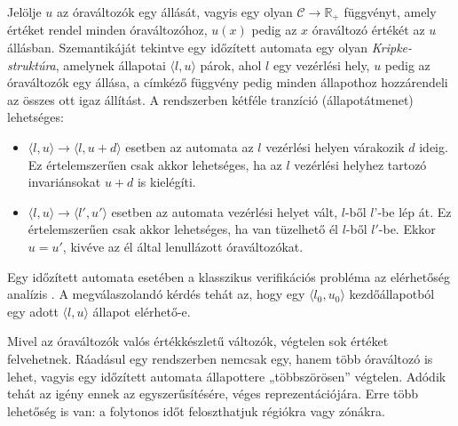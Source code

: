 Jelölje $u$ az óraváltozók egy állását, vagyis egy olyan $\mathcal{C} \rightarrow \mathbb{R}_+$ függvényt, amely értéket rendel minden óraváltozóhoz, $u(x)$ pedig az $x$ óraváltozó értékét az $u$ állásban. Szemantikáját tekintve egy időzített automata egy olyan \emph{Kripke-struktúra}, amelynek állapotai $\langle l, u \rangle$ párok, ahol $l$ egy vezérlési hely, $u$ pedig az óraváltozók egy állása, a címkéző függvény pedig minden állapothoz hozzárendeli az összes ott igaz állítást. A rendszerben kétféle tranzíció (állapotátmenet) lehetséges:
\begin{itemize}
    \item $\langle l, u \rangle \rightarrow \langle l, u + d \rangle$ esetben az automata az $l$ vezérlési helyen várakozik $d$ ideig. Ez értelemszerűen csak akkor lehetséges, ha az $l$ vezérlési helyhez tartozó invariánsokat $u + d$ is kielégíti.
    \item $\langle l, u \rangle \rightarrow \langle l', u' \rangle$ esetben az automata vezérlési helyet vált, $l$-ből $l$'-be lép át. Ez értelemszerűen csak akkor lehetséges, ha van tüzelhető él $l$-ből $l'$-be. Ekkor $u = u'$, kivéve az él által lenullázott óraváltozókat.
\end{itemize}
Egy időzített automata esetében a klasszikus verifikációs probléma az elérhetőség analízis \cite{RealTimeModelChecking}. A megválaszolandó kérdés tehát az, hogy egy $\langle l_0, u_0 \rangle$ kezdőállapotból egy adott $\langle l, u \rangle$ állapot elérhető-e.

Mivel az óraváltozók valós értékkészletű változók, végtelen sok értéket felvehetnek. Ráadásul egy rendszerben nemcsak egy, hanem több óraváltozó is lehet, vagyis egy időzített automata állapottere „többszörösen” végtelen. Adódik tehát az igény ennek az egyszerűsítésére, véges reprezentációjára. Erre több lehetőség is van: a folytonos időt feloszthatjuk régiókra vagy zónákra.


